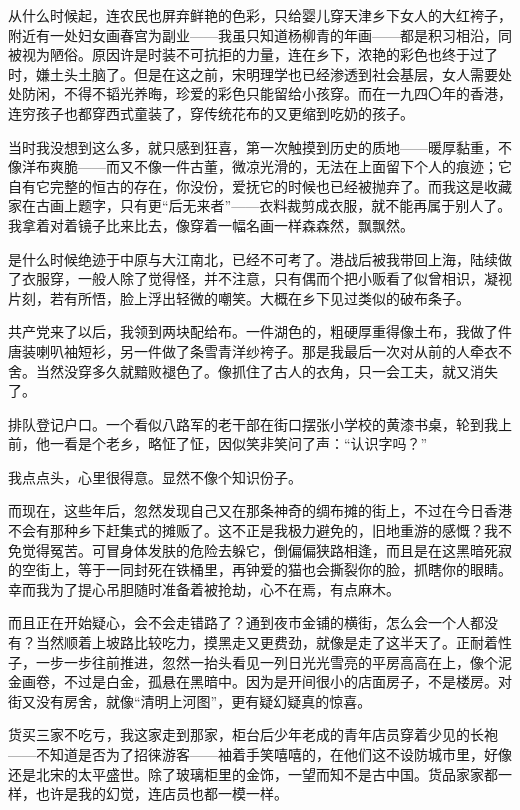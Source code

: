 \par 从什么时候起，连农民也屏弃鲜艳的色彩，只给婴儿穿天津乡下女人的大红袴子，附近有一处妇女画春宫为副业——我虽只知道杨柳青的年画——都是积习相沿，同被视为陋俗。原因许是时装不可抗拒的力量，连在乡下，浓艳的彩色也终于过了时，嫌土头土脑了。但是在这之前，宋明理学也已经渗透到社会基层，女人需要处处防闲，不得不韬光养晦，珍爱的彩色只能留给小孩穿。而在一九四〇年的香港，连穷孩子也都穿西式童装了，穿传统花布的又更缩到吃奶的孩子。
\par 当时我没想到这么多，就只感到狂喜，第一次触摸到历史的质地——暖厚黏重，不像洋布爽脆——而又不像一件古董，微凉光滑的，无法在上面留下个人的痕迹；它自有它完整的恒古的存在，你没份，爱抚它的时候也已经被抛弃了。而我这是收藏家在古画上题字，只有更“后无来者”——衣料裁剪成衣服，就不能再属于别人了。我拿着对着镜子比来比去，像穿着一幅名画一样森森然，飘飘然。
\par 是什么时候绝迹于中原与大江南北，已经不可考了。港战后被我带回上海，陆续做了衣服穿，一般人除了觉得怪，并不注意，只有偶而个把小贩看了似曾相识，凝视片刻，若有所悟，脸上浮出轻微的嘲笑。大概在乡下见过类似的破布条子。
\par 共产党来了以后，我领到两块配给布。一件湖色的，粗硬厚重得像土布，我做了件唐装喇叭袖短衫，另一件做了条雪青洋纱袴子。那是我最后一次对从前的人牵衣不舍。当然没穿多久就黯败褪色了。像抓住了古人的衣角，只一会工夫，就又消失了。
\par 排队登记户口。一个看似八路军的老干部在街口摆张小学校的黄漆书桌，轮到我上前，他一看是个老乡，略怔了怔，因似笑非笑问了声：“认识字吗？”
\par 我点点头，心里很得意。显然不像个知识份子。
\par 而现在，这些年后，忽然发现自己又在那条神奇的绸布摊的街上，不过在今日香港不会有那种乡下赶集式的摊贩了。这不正是我极力避免的，旧地重游的感慨？我不免觉得冤苦。可冒身体发肤的危险去躲它，倒偏偏狭路相逢，而且是在这黑暗死寂的空街上，等于一同封死在铁桶里，再钟爱的猫也会撕裂你的脸，抓瞎你的眼睛。幸而我为了提心吊胆随时准备着被抢劫，心不在焉，有点麻木。
\par 而且正在开始疑心，会不会走错路了？通到夜市金铺的横街，怎么会一个人都没有？当然顺着上坡路比较吃力，摸黑走又更费劲，就像是走了这半天了。正耐着性子，一步一步往前推进，忽然一抬头看见一列日光光雪亮的平房高高在上，像个泥金画卷，不过是白金，孤悬在黑暗中。因为是开间很小的店面房子，不是楼房。对街又没有房舍，就像“清明上河图”，更有疑幻疑真的惊喜。
\par 货买三家不吃亏，我这家走到那家，柜台后少年老成的青年店员穿着少见的长袍——不知道是否为了招徕游客——袖着手笑嘻嘻的，在他们这不设防城市里，好像还是北宋的太平盛世。除了玻璃柜里的金饰，一望而知不是古中国。货品家家都一样，也许是我的幻觉，连店员也都一模一样。
